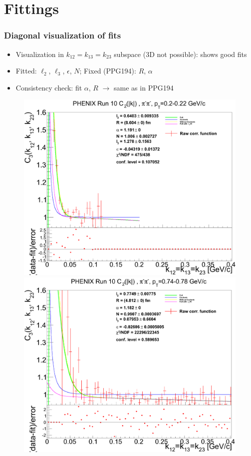\documentclass{beamer}
\begin{document}
\section{Fittings}

\begin{frame}
\frametitle{Diagonal visualization of fits}
\begin{itemize}
\setlength{\itemsep}{5pt}
\item Visualization in $k_{12}=k_{13}=k_{23}$ subspace (3D not possible):  shows good fits
\item Fitted: $\ell_2$, $\ell_3$, $\epsilon$, $N$; Fixed (PPG194): $R$, $\alpha$
\item Consistency check: fit $\alpha$, $R$ $\rightarrow$ same as in PPG194
\end{itemize}
\begin{figure}
\includegraphics[scale=0.13]{pic/C_icharge0_pt2}
\includegraphics[scale=0.13]{pic/C_icharge0_pt29}

\end{figure}
\end{frame}
\end{document}
